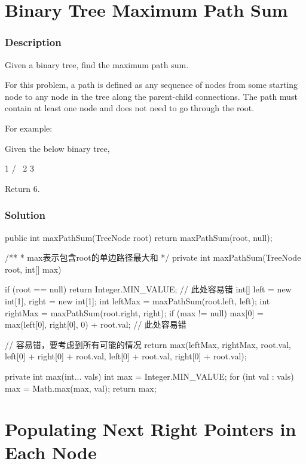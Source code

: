 \newpage

\section{Binary Tree Maximum Path Sum} %

\subsubsection{Description}

Given a binary tree, find the maximum path sum.

For this problem, a path is defined as any sequence of nodes from some starting node to any node in the tree along the parent-child connections. The path must contain at least one node and does not need to go through the root.

For example:

Given the below binary tree,
\begin{Code}
       1
      / \
     2   3
\end{Code}

Return 6.

\subsubsection{Solution}

\begin{Code}
public int maxPathSum(TreeNode root) {
    return maxPathSum(root, null);
}

/**
 * max表示包含root的单边路径最大和
 */
private int maxPathSum(TreeNode root, int[] max) {
    if (root == null) {
        return Integer.MIN_VALUE;  // 此处容易错
    }
    int[] left = new int[1], right = new int[1];
    int leftMax = maxPathSum(root.left, left);
    int rightMax = maxPathSum(root.right, right);
    if (max != null) {
        max[0] = max(left[0], right[0], 0) + root.val; // 此处容易错
    }

    // 容易错，要考虑到所有可能的情况
    return max(leftMax, rightMax, root.val, left[0] + right[0] + root.val,
            left[0] + root.val, right[0] + root.val);
}

private int max(int... vals) {
    int max = Integer.MIN_VALUE;
    for (int val : vals) {
        max = Math.max(max, val);
    }
    return max;
}
\end{Code}

\newpage

\section{Populating Next Right Pointers in Each Node} %

